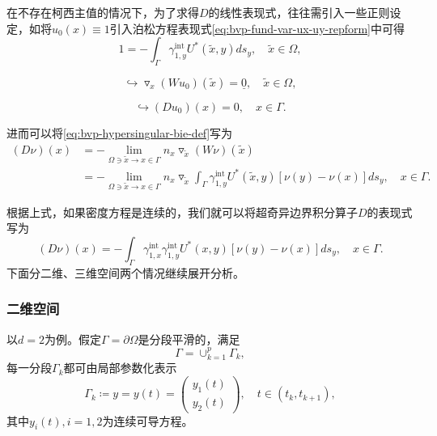 在不存在柯西主值的情况下，为了求得$D$的线性表现式，往往需引入一些正则设定，如将$u_{0}(x) \equiv 1 $引入泊松方程表现式\eqref{eq:bvp-fund-var-ux-uy-repform}中可得
\begin{equation*}
  1 = - \int_{\Gamma} \gamma_{1,y}^{\text{int}} U^{*}(\widetilde{x},y) d s_y, \quad \widetilde{x} \in \Omega,
\end{equation*}

\begin{equation*}
  \hookrightarrow \triangledown_{x} \left( W u_{0} \right)(\widetilde{x}) = \underline{0}, \quad \widetilde{x} \in \Omega,
\end{equation*}

\begin{equation}
  \label{eq:bvp-hyper-bie-D-u0-equiv0}
  \hookrightarrow \left( D u_{0} \right) (x) = 0, \quad x \in \Gamma.
\end{equation}

进而可以将\eqref{eq:bvp-hypersingular-bie-def}写为
\begin{equation*}
  \begin{split}
  \left( D \nu \right)(x)
  &= - \lim_{\Omega \ni \widetilde{x} \rightarrow x \in \Gamma}
  n_x \triangledown_{\widetilde{x}} \left( W \nu \right)(\widetilde{x}) \\
  &= - \lim_{\Omega \ni \widetilde{x} \rightarrow x \in \Gamma}
  n_x \triangledown_{\widetilde{x}}
  \int_{\Gamma}
  \gamma_{1,y}^{\text{int}}
  U^{*}(\widetilde{x}, y)
  \left[ \nu(y) - \nu(x) \right]
  d s_y, \quad x \in \Gamma.
\end{split}
\end{equation*}

根据上式，如果密度方程是连续的，我们就可以将超奇异边界积分算子$D$的表现式写为
\begin{equation}
  \label{eq:bvp-hypersingular-operator-representation-form}
  \left( D \nu \right)(x) =
  - \int_{\Gamma}
  \gamma_{1,x}^{\text{int}}
  \gamma_{1,y}^{\text{int}}
  U^{*}(x,y)
  \left[
  \nu(y) - \nu(x)
  \right]
  d s_y, \quad x \in \Gamma.
\end{equation}
下面分二维、三维空间两个情况继续展开分析。

\subsubsection{二维空间}
\label{sec:bvp-hyperbie-operator-d2}
以$d=2$为例。假定$\Gamma = \partial \Omega$是分段平滑的，满足
\begin{equation*}
  \Gamma = \cup_{k=1}^{p} \Gamma_{k},
\end{equation*}
每一分段$\Gamma_{k}$都可由局部参数化表示
\begin{equation}
  \label{eq:bvp-hypersingular-gamma-k}
  \Gamma_{k} \coloneqq y = y(t) = \begin{pmatrix}
  y_1(t) \\ y_2 (t)
  \end{pmatrix}
  , \quad t \in \left( t_k, t_{k+1} \right),
\end{equation}
其中$y_{i}(t),i=1,2$为连续可导方程。

